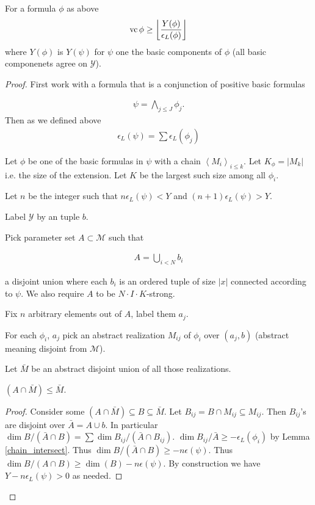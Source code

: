 \documentclass{amsart}
\newcommand{\MM}{\mathscr M}
\newcommand{\Y}{\mathcal Y}
\newcommand{\agl}[1]{\left\langle #1 \right\rangle}
\providecommand{\floor}[1]{\left \lfloor #1 \right \rfloor }
\begin{document}
\begin{Theorem}
  For a formula $\phi$ as above
  \begin{align*}
    \vc \phi \geq \floor{\frac{Y(\phi)}{\epsilon_L(\phi)}}
  \end{align*}
  where $Y(\phi)$ is $Y(\psi)$ for $\psi$ one the basic components of $\phi$ (all basic componenets agree on $\Y$).
\end{Theorem}

\begin{proof}
  First work with a formula that is a conjunction of positive basic formulas

  \begin{align*}
    \psi = \bigwedge_{j \leq J} \phi_j.
  \end{align*}
  Then as we defined above
  \begin{align*}
    \epsilon_L(\psi) = \sum \epsilon_L(\phi_j)
  \end{align*}
  
  Let $\phi$ be one of the basic formulas in $\psi$ with a chain $\agl{M_i}_{i \leq k}$.
  Let $K_\phi = |M_k|$ i.e. the size of the extension.
  Let $K$ be the largest such size among all $\phi_i$.

  Let $n$ be the integer such that $n \epsilon_L(\psi) < Y$ and $(n+1) \epsilon_L(\psi) > Y$.

  Label $\Y$ by an tuple $b$.

  Pick parameter set $A \subset \MM$ such that 

  \begin{align*}
    A = \bigcup_{i<N} b_i
  \end{align*}

  a disjoint union where each $b_i$ is an ordered tuple of size $|x|$ connected according to $\psi$.
  We also require $A$ to be $N \cdot I \cdot K$-strong.

  Fix $n$ arbitrary elements out of $A$, label them $a_j$.

  For each $\phi_i$, $a_j$ pick an abstract realization $M_{ij}$ of $\phi_i$ over $(a_j, b)$
  (abstract meaning disjoint from $\MM$).
  
  Let $\bar M$ be an abstract disjoint union of all those realizations.

  \begin{Claim}
    $(A \cap \bar M) \leq \bar M$.
  \end{Claim}
  \begin{proof}
    Consider some $(A \cap \bar M) \subseteq B \subseteq \bar M$.
    Let $B_{ij} = B \cap M_{ij} \subseteq M_{ij}$.
    Then $B_{ij}$'s are disjoint over $\bar A = A \cup b$.
    In particular $\dim B / (\bar A \cap B) = \sum \dim B_{ij} / (\bar A \cap B_{ij})$.
    $\dim B_{ij} / \bar A \geq -\epsilon_L(\phi_i)$ by Lemma \ref{chain_intersect}.
    Thus $\dim B / (\bar A \cap B) \geq -n\epsilon(\psi)$.
    Thus $\dim B / (A \cap B) \geq \dim(B) - n\epsilon(\psi)$.
    By construction we have $Y - n\epsilon_L(\psi) > 0$ as needed.
  \end{proof}


\end{proof}
\end{document}
